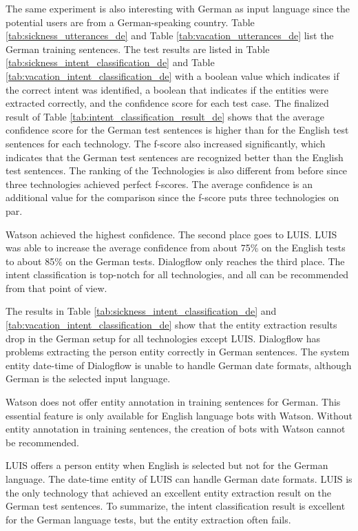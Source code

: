The same experiment is also interesting with German as input language since the potential users are from a German-speaking country.
Table \ref{tab:sickness_utterances_de} and 
Table \ref{tab:vacation_utterances_de} list the German training sentences.
The test results are listed in Table \ref{tab:sickness_intent_classification_de} 
and Table \ref{tab:vacation_intent_classification_de} with a boolean value which indicates if the correct intent was identified, a boolean that indicates if the entities were extracted correctly,
and the confidence score for each test case.
The finalized result of Table \ref{tab:intent_classification_result_de} shows that the average confidence score for the German test sentences is higher than for the English test sentences for each technology.
The f-score also increased significantly, which indicates that the German test sentences are recognized better than the English test sentences.
The ranking of the Technologies is also different from before since three technologies achieved perfect f-scores.
The average confidence is an additional value for the comparison since the f-score puts three technologies on par.

Watson achieved the highest confidence.
The second place goes to LUIS.
LUIS was able to increase the average confidence from about 75\% on the English tests to about 85\% on the German tests.
Dialogflow only reaches the third place.
The intent classification is top-notch for all technologies, and all can be recommended from that point of view.

The results in Table \ref{tab:sickness_intent_classification_de} and \ref{tab:vacation_intent_classification_de} show that the entity extraction results drop in the German setup for all technologies except LUIS.
Dialogflow has problems extracting the person entity correctly in German sentences.
The system entity date-time of Dialogflow is unable to handle German date formats, although German is the selected input language.

Watson does not offer entity annotation in training sentences for German.
This essential feature is only available for English language bots with Watson.
Without entity annotation in training sentences, the creation of bots with Watson cannot be recommended.

LUIS offers a person entity when English is selected but not for the German language.
The date-time entity of LUIS can handle German date formats. 
LUIS is the only technology that achieved an excellent entity extraction result on the German test sentences.
To summarize, the intent classification result is excellent for the German language tests, but the entity extraction often fails.






